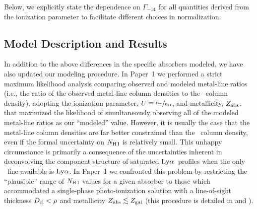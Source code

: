 \documentclass[twocolumn,twocolappendix,tighten,times]{aastex6}
\newcommand{\HI}{\ion{H}{1}}
\newcommand{\lya}{\ensuremath{{\rm Ly}\alpha}}
\begin{document}
Below, we explicitly state the dependence on $\Gamma_{-14}$ for all quantities 
derived from the ionization parameter to facilitate different choices in 
normalization.



\subsection{Model Description and Results}
\label{cloudy:description}

In addition to the above differences in the specific absorbers modeled, we have 
also updated our modeling procedure. In Paper~1 we performed a strict maximum 
likelihood analysis comparing observed and modeled metal-line ratios (i.e., the 
ratio of the observed metal-line column densities to the \HI\ column density), 
adopting the ionization parameter, $U \equiv \sfrac{n_{\gamma}}{n_{\rm H}}$, and 
metallicity, $Z_{\rm abs}$, that maximized the likelihood of simultaneously 
observing all of the modeled metal-line ratios as our ``modeled'' value. 
However, it is usually the case that the metal-line column densities are far 
better constrained than the \HI\ column density, even if the formal uncertainty 
on $N_{\rm H\,I}$ is relatively small. This unhappy circumstance is primarily 
a consequence of the uncertainties inherent in deconvolving the component 
structure of saturated \lya\ profiles when the only \HI\ line available is \lya. 
In Paper~1 we confronted this problem by restricting the ``plausible'' range of 
$N_{\rm H\,I}$ values for a given absorber to those which accommodated a 
single-phase photo-ionization solution with a line-of-sight thickness 
$D_{\rm cl}<\rho$ and metallicity $Z_{\rm abs} \lesssim Z_{\rm gal}$ 
(this procedure is detailed in \citealp{keeney13} and \citealp{davis15}). 
\end{document}
